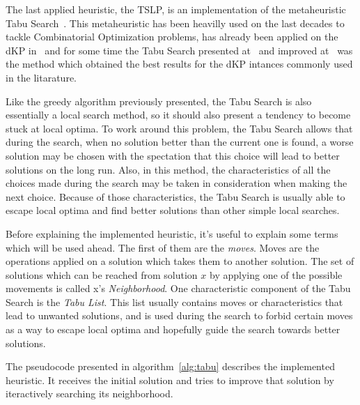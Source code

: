 The last applied heuristic, the TSLP, is an implementation of the metaheuristic Tabu Search~\cite{glover1989tabup1}. This metaheuristic has been heavilly used on the
last decades to tackle Combinatorial Optimization problems, has already been applied on the dKP in~\cite{danmeyer1993} and for some time the Tabu Search presented at~\cite{vasquez2001} 
and improved at~\cite{vasquez2005} was the method which obtained the best results for the dKP intances commonly used in the litarature.

Like the greedy algorithm previously presented, the Tabu Search is also essentially a local search method, so it should also present a tendency to 
become stuck at local optima. To work around this problem, the Tabu Search allows that during the search, when no solution better than the current one is found,
a worse solution may be chosen with the spectation that this choice will lead to better solutions on the long run. Also, in this method, the characteristics
of all the choices made during the search may be taken in consideration when making the next choice. Because of those characteristics, the Tabu Search is usually
able to escape local optima and find better solutions than other simple local searches.

Before explaining the implemented heuristic, it's useful to explain some terms which will be used ahead. The first of them are the 
\textit{moves}. Moves are the operations applied on a solution which takes them to another solution. The set of solutions which can be reached
from solution $x$ by applying one of the possible movements is called x's \textit{Neighborhood}. One characteristic component of the Tabu Search is the
\textit{Tabu List}. This list usually contains moves or characteristics that lead to unwanted solutions, and is used during the search to forbid certain moves
as a way to escape local optima and hopefully guide the search towards better solutions.

The pseudocode presented in algorithm~\ref{alg:tabu} describes the implemented heuristic. It receives the 
initial solution and tries to improve that solution by iteractively searching its neighborhood.

